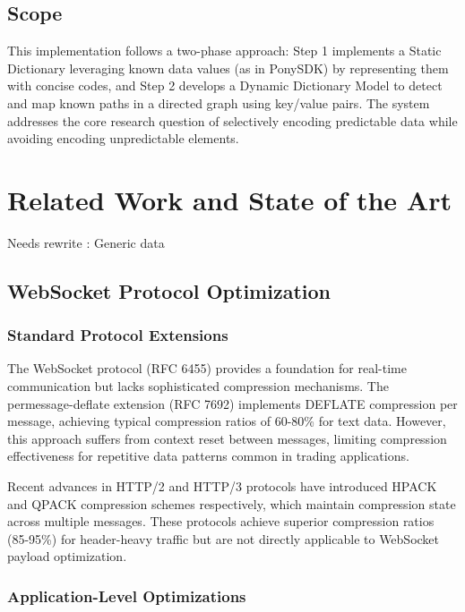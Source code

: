 \documentclass[12pt,a4paper]{article}
\begin{document}
\subsection{Scope}

This implementation follows a two-phase approach: Step 1 implements a Static Dictionary leveraging known data values (as in PonySDK) by representing them with concise codes, and Step 2 develops a Dynamic Dictionary Model to detect and map known paths in a directed graph using key/value pairs. The system addresses the core research question of selectively encoding predictable data while avoiding encoding unpredictable elements.

\section{Related Work and State of the Art}

Needs rewrite : Generic data

\subsection{WebSocket Protocol Optimization}

\subsubsection{Standard Protocol Extensions}

The WebSocket protocol (RFC 6455) \cite{websocket-rfc} provides a foundation for real-time communication but lacks sophisticated compression mechanisms. The permessage-deflate extension (RFC 7692) \cite{permessage-deflate} implements DEFLATE compression per message, achieving typical compression ratios of 60-80\% for text data. However, this approach suffers from context reset between messages, limiting compression effectiveness for repetitive data patterns common in trading applications.

Recent advances in HTTP/2 and HTTP/3 protocols have introduced HPACK \cite{hpack-rfc} and QPACK compression schemes respectively, which maintain compression state across multiple messages. These protocols achieve superior compression ratios (85-95\%) for header-heavy traffic but are not directly applicable to WebSocket payload optimization.

\subsubsection{Application-Level Optimizations}
\end{document}
